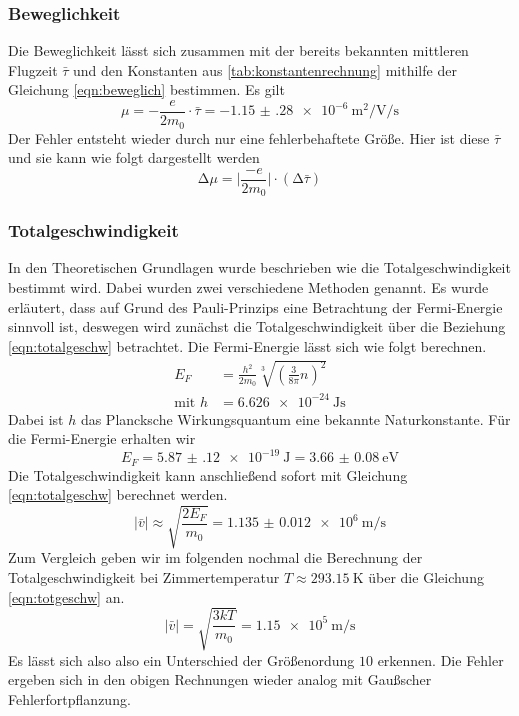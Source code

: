 \subsubsection{Beweglichkeit}
Die Beweglichkeit lässt sich zusammen mit der bereits bekannten mittleren Flugzeit $\bar{\tau}$ und den Konstanten aus \ref{tab:konstantenrechnung} mithilfe
der Gleichung \eqref{eqn:beweglich} bestimmen.
Es gilt
\begin{equation}
\mu = - \frac{e}{2 m_{0}} \cdot \bar{\tau} = \SI{-1.15(28)e-6}{\meter\squared\per\volt\per\second}
\end{equation}
Der Fehler entsteht wieder durch nur eine fehlerbehaftete Größe. Hier ist diese $\bar{\tau}$ und sie kann wie folgt dargestellt werden
\begin{equation}
\increment \mu = \biggl| \frac{-e}{2m_{0}}\biggr| \cdot (\increment \bar{\tau})
\end{equation}


\subsubsection{Totalgeschwindigkeit}
In den Theoretischen Grundlagen wurde beschrieben wie die Totalgeschwindigkeit bestimmt wird. Dabei wurden zwei verschiedene Methoden genannt. 
Es wurde erläutert, dass auf Grund des Pauli-Prinzips eine Betrachtung der Fermi-Energie sinnvoll ist, deswegen wird zunächst die Totalgeschwindigkeit über die Beziehung \eqref{eqn:totalgeschw}
betrachtet.
Die Fermi-Energie lässt sich wie folgt berechnen.
\begin{align}
E_{F} &= \frac{h^{2}}{2 m_{0}} \sqrt[3]{\left( \frac{3}{8\pi} n \right)^{2}} \\[0.5em]
\text{mit  } h &= \SI{6.626e-24}{\joule\second}
\end{align}
Dabei ist $h$ das Plancksche Wirkungsquantum eine bekannte Naturkonstante.
Für die Fermi-Energie erhalten wir
\begin{equation}
E_{F}= \SI{5.87(12)e-19}{\joule} = \SI{3.66(8)}{\electronvolt}
\end{equation}
Die Totalgeschwindigkeit kann anschließend sofort mit Gleichung \eqref{eqn:totalgeschw} berechnet werden.
\begin{equation}
\lvert \bar{v} \rvert \approx \sqrt{\frac{2 E_{F}}{m_{0}}} = \SI{1.135(12)e6}{\meter\per\second}
\end{equation}
Zum Vergleich geben wir im folgenden nochmal die Berechnung der Totalgeschwindigkeit bei Zimmertemperatur $T \approx \SI{293.15}{\kelvin}$ über die 
Gleichung \eqref{eqn:totgeschw} an.
\begin{equation}
\lvert \bar{v} \rvert = \sqrt{\frac{3kT}{m_{0}}} = \SI{1.15e5}{\meter\per\second}
\end{equation}
Es lässt sich also also ein Unterschied der Größenordung $10$ erkennen.
Die Fehler ergeben sich in den obigen Rechnungen wieder analog mit Gaußscher Fehlerfortpflanzung.

